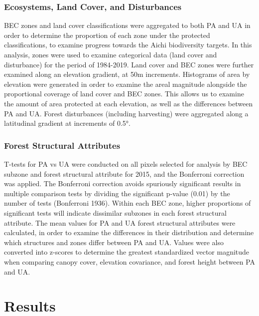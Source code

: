 \documentclass[10pt,oneside]{article}
\begin{document}
\hypertarget{ecosystems-land-cover-and-disturbances}{%
\subsubsection{Ecosystems, Land Cover, and
Disturbances}\label{ecosystems-land-cover-and-disturbances}}

BEC zones and land cover classifications were aggregated to both PA and
UA in order to determine the proportion of each zone under the protected
classifications, to examine progress towards the Aichi biodiversity
targets. In this analysis, zones were used to examine categorical data
(land cover and disturbance) for the period of 1984-2019. Land cover and
BEC zones were further examined along an elevation gradient, at 50m
increments. Histograms of area by elevation were generated in order to
examine the areal magnitude alongside the proportional coverage of land
cover and BEC zones. This allows us to examine the amount of area
protected at each elevation, as well as the differences between PA and
UA. Forest disturbances (including harvesting) were aggregated along a
latitudinal gradient at increments of 0.5°.

\hypertarget{forest-structural-attributes}{%
\subsubsection{Forest Structural
Attributes}\label{forest-structural-attributes}}

T-tests for PA vs UA were conducted on all pixels selected for analysis
by BEC subzone and forest structural attribute for 2015, and the
Bonferroni correction was applied. The Bonferroni correction avoids
spuriously significant results in multiple comparison tests by dividing
the significant p-value (0.01) by the number of tests (Bonferroni 1936).
Within each BEC zone, higher proportions of significant tests will
indicate dissimilar subzones in each forest structural attribute. The
mean values for PA and UA forest structural attributes were calculated,
in order to examine the differences in their distribution and determine
which structures and zones differ between PA and UA. Values were also
converted into z-scores to determine the greatest standardized vector
magnitude when comparing canopy cover, elevation covariance, and forest
height between PA and UA.

\hypertarget{results}{%
\section{Results}\label{results}}
\end{document}

